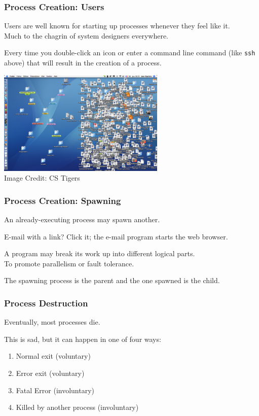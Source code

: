 \begin{frame}
	\frametitle{Process Creation: Users}

	Users are well known for starting up processes whenever they feel like it.\\
	\quad Much to the chagrin of system designers everywhere.

	Every time you double-click an icon or enter a command line command (like \texttt{ssh} above) that will result in the creation of a process.


	\begin{center}
		\includegraphics[width=0.6\textwidth]{images/desktop-shortcut.jpg}\\
		Image Credit: CS Tigers
	\end{center}

\end{frame}

\begin{frame}
	\frametitle{Process Creation: Spawning}

	An already-executing process may spawn another.

	E-mail with a link? Click it; the e-mail program starts the web browser.

	A program may break its work up into different logical parts.\\
	\quad To promote parallelism or fault tolerance.

	The spawning process is the \alert{parent} and the one spawned is the \alert{child}.


\end{frame}

\begin{frame}
	\frametitle{Process Destruction}

	Eventually, most processes die.

	This is sad, but it can happen in one of four ways:
	\begin{enumerate}
		\item Normal exit (voluntary)
		\item Error exit (voluntary)
		\item Fatal Error (involuntary)
		\item Killed by another process (involuntary)
	\end{enumerate}


\end{frame}

